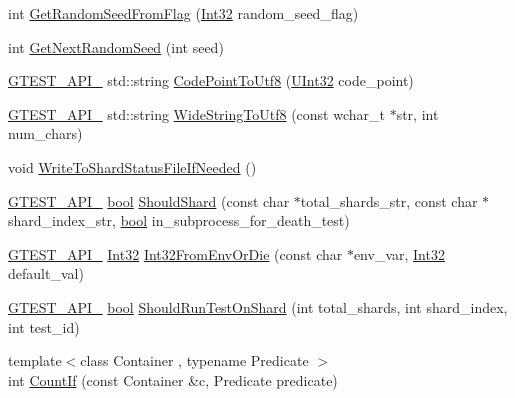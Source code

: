 \begin{DoxyCompactItemize}
\item 
int \hyperlink{namespacetesting_1_1internal_ae74fedbdaebaac8d1202192266243b9e}{Get\+Random\+Seed\+From\+Flag} (\hyperlink{namespacetesting_1_1internal_a8ee38faaf875f133358abaf9bc056cec}{Int32} random\+\_\+seed\+\_\+flag)
\item 
int \hyperlink{namespacetesting_1_1internal_a6e07a655cb987d131cd8fbeba9a7f1eb}{Get\+Next\+Random\+Seed} (int seed)
\item 
\hyperlink{gtest-port_8h_aa73be6f0ba4a7456180a94904ce17790}{G\+T\+E\+S\+T\+\_\+\+A\+P\+I\+\_\+} std\+::string \hyperlink{namespacetesting_1_1internal_a0c0f9558efb9abb965851c4738cdc725}{Code\+Point\+To\+Utf8} (\hyperlink{namespacetesting_1_1internal_a40d4fffcd2bf56f18b1c380615aa85e3}{U\+Int32} code\+\_\+point)
\item 
\hyperlink{gtest-port_8h_aa73be6f0ba4a7456180a94904ce17790}{G\+T\+E\+S\+T\+\_\+\+A\+P\+I\+\_\+} std\+::string \hyperlink{namespacetesting_1_1internal_a05b8c86ff38243f34d8f839a0eadefb1}{Wide\+String\+To\+Utf8} (const wchar\+\_\+t $\ast$str, int num\+\_\+chars)
\item 
void \hyperlink{namespacetesting_1_1internal_a19b35b39782d41e6ef76e1910a3a502e}{Write\+To\+Shard\+Status\+File\+If\+Needed} ()
\item 
\hyperlink{gtest-port_8h_aa73be6f0ba4a7456180a94904ce17790}{G\+T\+E\+S\+T\+\_\+\+A\+P\+I\+\_\+} \hyperlink{classbool}{bool} \hyperlink{namespacetesting_1_1internal_a0fe41657b1d1ab7ec4e37ec07403ee6c}{Should\+Shard} (const char $\ast$total\+\_\+shards\+\_\+str, const char $\ast$shard\+\_\+index\+\_\+str, \hyperlink{classbool}{bool} in\+\_\+subprocess\+\_\+for\+\_\+death\+\_\+test)
\item 
\hyperlink{gtest-port_8h_aa73be6f0ba4a7456180a94904ce17790}{G\+T\+E\+S\+T\+\_\+\+A\+P\+I\+\_\+} \hyperlink{namespacetesting_1_1internal_a8ee38faaf875f133358abaf9bc056cec}{Int32} \hyperlink{namespacetesting_1_1internal_aaa576613655c2f380278c255c3ec5fef}{Int32\+From\+Env\+Or\+Die} (const char $\ast$env\+\_\+var, \hyperlink{namespacetesting_1_1internal_a8ee38faaf875f133358abaf9bc056cec}{Int32} default\+\_\+val)
\item 
\hyperlink{gtest-port_8h_aa73be6f0ba4a7456180a94904ce17790}{G\+T\+E\+S\+T\+\_\+\+A\+P\+I\+\_\+} \hyperlink{classbool}{bool} \hyperlink{namespacetesting_1_1internal_a437bd89f5bc532778d7467600e210395}{Should\+Run\+Test\+On\+Shard} (int total\+\_\+shards, int shard\+\_\+index, int test\+\_\+id)
\item 
{\footnotesize template$<$class Container , typename Predicate $>$ }\\int \hyperlink{namespacetesting_1_1internal_a1e77a774d910346eff11a86d8df783a5}{Count\+If} (const Container \&c, Predicate predicate)

\end{DoxyCompactItemize}
